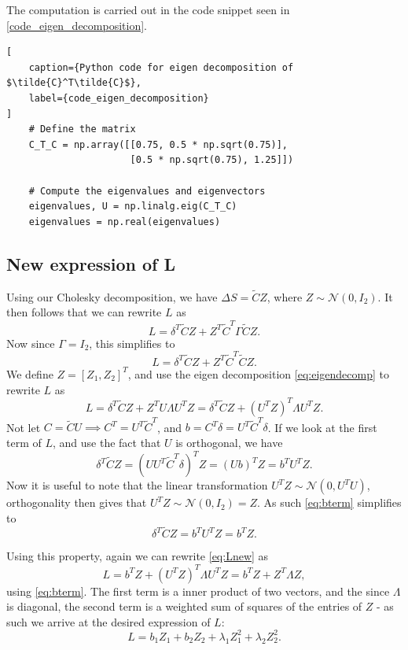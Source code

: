 \documentclass{article}
\begin{document}
The computation is carried out in the code snippet seen in \autoref{code_eigen_decomposition}.

\begin{lstlisting}[
    caption={Python code for eigen decomposition of $\tilde{C}^T\tilde{C}$},
    label={code_eigen_decomposition}
]
    # Define the matrix
    C_T_C = np.array([[0.75, 0.5 * np.sqrt(0.75)],
                      [0.5 * np.sqrt(0.75), 1.25]])

    # Compute the eigenvalues and eigenvectors
    eigenvalues, U = np.linalg.eig(C_T_C)
    eigenvalues = np.real(eigenvalues)

\end{lstlisting}
\subsection{New expression of L}
Using our Cholesky decomposition, we have $\Delta S = \tilde{C}Z$, where $Z \sim \mathcal{N}(0, I_2)$. It then follows that we can rewrite $L$ as
\begin{equation*}
    L = \delta^T\tilde{C}Z + Z^T\tilde{C}^T\Gamma\tilde{C}Z.
\end{equation*}
Now since $\Gamma = I_2$, this simplifies to
\begin{equation*}
    L = \delta^T\tilde{C}Z + Z^T\tilde{C}^T\tilde{C}Z.
\end{equation*}
We define $Z = [Z_1, Z_2]^T$, and use the eigen decomposition \eqref{eq:eigendecomp} to rewrite $L$ as
\begin{equation}
    L = \delta^T\tilde{C}Z + Z^TU\Lambda U^TZ = \delta^T\tilde{C}Z + (U^TZ)^T\Lambda U^TZ .
    \label{eq:Lnew}
\end{equation}
Not let $C = \tilde{C}U \implies C^T = U^T\tilde{C}^T$, and $b = C^T\delta = U^T\tilde{C}^T\delta$. If we look at the first term of $L$, and use the fact that $U$ is orthogonal, we have
\begin{equation}
    \delta^T\tilde{C}Z = (UU^T\tilde{C}^T\delta)^TZ = (Ub)^TZ = b^TU^TZ.
    \label{eq:bterm}
\end{equation}
Now it is useful to note that the linear transformation $U^TZ \sim \mathcal{N}(0, U^TU)$, orthogonality then gives that
$U^TZ \sim \mathcal{N}(0, I_2) = Z$. As such \eqref{eq:bterm} simplifies to
\begin{equation*}
    \delta^T\tilde{C}Z = b^TU^TZ = b^TZ.
\end{equation*}


Using this property, again we can rewrite \eqref{eq:Lnew} as
\begin{equation*}
    L = b^TZ + (U^TZ)^T \Lambda U^TZ = b^TZ + Z^T\Lambda Z,
\end{equation*}
using \eqref{eq:bterm}. The first term is a inner product of two vectors, and the since $\Lambda$ is diagonal, the second term is a weighted sum of squares of the entries of $Z$ - as such we arrive at the desired expression of $L$:
\begin{equation}
    L = b_1Z_1 + b_2Z_2 + \lambda_1Z_1^2 + \lambda_2Z_2^2.
    \label{eq:Lfinal}
\end{equation}
\end{document}
